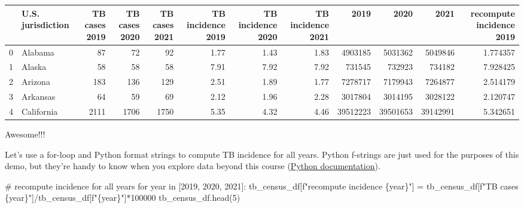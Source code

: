 \documentclass[
  letterpaper,
  DIV=11,
  numbers=noendperiod]{scrreprt}
\newenvironment{Shaded}{\begin{snugshade}}{\end{snugshade}}
\newcommand{\CommentTok}[1]{\textcolor[rgb]{0.37,0.37,0.37}{#1}}
\newcommand{\ControlFlowTok}[1]{\textcolor[rgb]{0.00,0.23,0.31}{#1}}
\newcommand{\DecValTok}[1]{\textcolor[rgb]{0.68,0.00,0.00}{#1}}
\newcommand{\KeywordTok}[1]{\textcolor[rgb]{0.00,0.23,0.31}{#1}}
\newcommand{\NormalTok}[1]{\textcolor[rgb]{0.00,0.23,0.31}{#1}}
\newcommand{\OperatorTok}[1]{\textcolor[rgb]{0.37,0.37,0.37}{#1}}
\newcommand{\SpecialCharTok}[1]{\textcolor[rgb]{0.37,0.37,0.37}{#1}}
\newcommand{\SpecialStringTok}[1]{\textcolor[rgb]{0.13,0.47,0.30}{#1}}
\begin{document}
\begin{tabular}{llrrrrrrrrrr}
\toprule
{} & U.S. jurisdiction &  TB cases 2019 &  TB cases 2020 &  TB cases 2021 &  TB incidence 2019 &  TB incidence 2020 &  TB incidence 2021 &      2019 &      2020 &      2021 &  recompute incidence 2019 \\
\midrule
0 &           Alabama &             87 &             72 &             92 &               1.77 &               1.43 &               1.83 &   4903185 &   5031362 &   5049846 &                  1.774357 \\
1 &            Alaska &             58 &             58 &             58 &               7.91 &               7.92 &               7.92 &    731545 &    732923 &    734182 &                  7.928425 \\
2 &           Arizona &            183 &            136 &            129 &               2.51 &               1.89 &               1.77 &   7278717 &   7179943 &   7264877 &                  2.514179 \\
3 &          Arkansas &             64 &             59 &             69 &               2.12 &               1.96 &               2.28 &   3017804 &   3014195 &   3028122 &                  2.120747 \\
4 &        California &           2111 &           1706 &           1750 &               5.35 &               4.32 &               4.46 &  39512223 &  39501653 &  39142991 &                  5.342651 \\
\bottomrule
\end{tabular}

Awesome!!!

Let's use a for-loop and Python format strings to compute TB incidence
for all years. Python f-strings are just used for the purposes of this
demo, but they're handy to know when you explore data beyond this course
(\href{https://docs.python.org/3/tutorial/inputoutput.html}{Python
documentation}).

\begin{Shaded}
\begin{Highlighting}[]
\CommentTok{\# recompute incidence for all years}
\ControlFlowTok{for}\NormalTok{ year }\KeywordTok{in}\NormalTok{ [}\DecValTok{2019}\NormalTok{, }\DecValTok{2020}\NormalTok{, }\DecValTok{2021}\NormalTok{]:}
\NormalTok{    tb\_census\_df[}\SpecialStringTok{f"recompute incidence }\SpecialCharTok{\{}\NormalTok{year}\SpecialCharTok{\}}\SpecialStringTok{"}\NormalTok{] }\OperatorTok{=}\NormalTok{ tb\_census\_df[}\SpecialStringTok{f"TB cases }\SpecialCharTok{\{}\NormalTok{year}\SpecialCharTok{\}}\SpecialStringTok{"}\NormalTok{]}\OperatorTok{/}\NormalTok{tb\_census\_df[}\SpecialStringTok{f"}\SpecialCharTok{\{}\NormalTok{year}\SpecialCharTok{\}}\SpecialStringTok{"}\NormalTok{]}\OperatorTok{*}\DecValTok{100000}
\NormalTok{tb\_census\_df.head(}\DecValTok{5}\NormalTok{)}
\end{Highlighting}
\end{Shaded}
\end{document}
